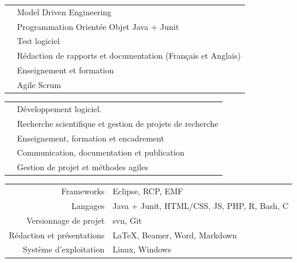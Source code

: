 \tair

\sectionline{}

\tair


\begin{tabular}{r @{~$\rangle$~} p{}}
 & Model Driven Engineering \\
 & Programmation Orientée Objet Java + Junit \\
 & Test logiciel \\
 & Rédaction de rapports et documentation (Français et Anglais) \\
 & Enseignement et formation \\
 & Agile Scrum \\
\end{tabular}

\tair


\begin{tabular}{r @{~$\rangle$~} p{}}
 & Développement logiciel. \\
 & Recherche scientifique et gestion de projets de recherche \\
 & Enseignement, formation et encadrement \\
 & Communication, documentation et publication \\
 & Gestion de projet et méthodes agiles \\
\end{tabular}

\tair


\begin{tabular}{r @{~$\rangle$~} p{}}
Frameworks & Eclipse, RCP, EMF\\
Langages & Java + Junit, HTML/CSS, JS, PHP, R, Bash, C \\
Versionnage de projet & svn, Git \\
Rédaction et présentations & LaTeX, Beamer, Word, Markdown \\
Système d’exploitation & Linux, Windows \\
\end{tabular}





